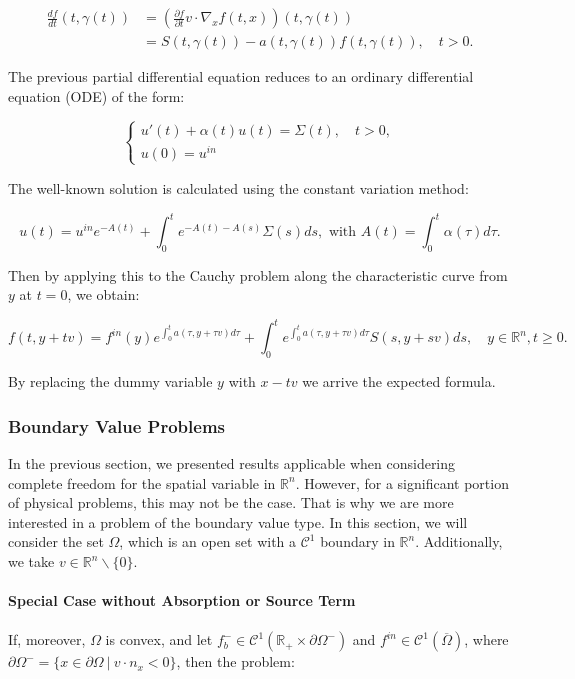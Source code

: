 \documentclass[a4paper, 11pt]{article}
\begin{document}
\[
\begin{aligned}
\frac{d f}{d t}(t,\gamma(t))&=(\frac{\partial f}{\partial t}
v \cdot \nabla_x f(t,x))(t,\gamma(t)) \\ &= S(t,\gamma(t))-a(t,\gamma(t))f(t,\gamma(t)), \quad t>0.
\end{aligned}
\]

The previous partial differential equation reduces to an ordinary differential equation (ODE) of the form:



\[
\begin{cases}
u'(t)+\alpha(t)u(t)=\Sigma(t), \quad t>0,\\
u(0)=u^{in}
\end{cases}
\]

The well-known solution is calculated using the constant variation method:

\[ u(t) = u^{in} e^{-A(t)} + \int_{0}^{t} e^{-A(t)-A(s)}\Sigma(s)ds, \text{ with } A(t)=\int_{0}^{t} \alpha (\tau) d\tau. \]

Then by applying this to the Cauchy problem along the characteristic curve from $y$ at $t=0$, we obtain:

\[ f(t,y+tv) = f^{in}(y) e^{\int_{0}^{t}a(\tau,y+\tau v)d\tau} + \int_{0}^{t} e^{\int_{0}^{t}a(\tau,y+\tau v)d\tau}S(s,y+sv)ds, \quad y\in \mathbb{R}^n, t \geq 0.\]

By replacing the dummy variable $y$ with $x-tv$ we arrive the expected formula.

\subsubsection{Boundary Value Problems}

In the previous section, we presented results applicable when considering complete freedom for the spatial variable in $\mathbb{R}^n$. However, for a significant portion of physical problems, this may not be the case. That is why we are more interested in a problem of the boundary value type. In this section, we will consider the set $\Omega$, which is an open set with a $\mathcal{C}^1$ boundary in $\mathbb{R}^n$. Additionally, we take $v \in \mathbb{R}^n\backslash \{0\}$.

\paragraph{Special Case without Absorption or Source Term}

\paragraph{}
If, moreover, $\Omega$ is convex, and let $f_b^- \in \mathcal{C}^1(\mathbb{R}_+ \times \partial \Omega^-)$ and $f^{in} \in \mathcal{C}^1(\overline{\Omega})$, where $\partial \Omega^- = \{x\in\partial \Omega~ | ~ v\cdot n_x<0\}$, then the problem:
\end{document}
